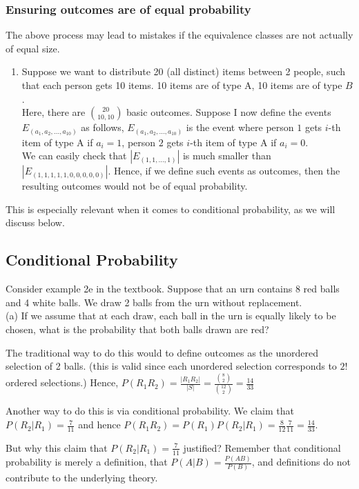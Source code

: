 \documentclass{article}
\begin{document}
\subsubsection{Ensuring outcomes are of equal probability}
The above process may lead to mistakes if the equivalence classes are not actually of equal size.

\begin{enumerate}
	\item Suppose we want to distribute 20 (all distinct) items between 2 people, such that each person gets 10 items. 10 items are of type A, 10 items are of type $B$.\\
	Here, there are $\binom{20}{10,10}$ basic outcomes.
	Suppose I now define the events $E_{(a_1, a_2,...,a_{10})}$ as follows, $E_{(a_1, a_2,...,a_{10})}$ is the event where person $1$ gets $i$-th item of type A if $a_i=1$, person $2$ gets $i$-th item of type A if $a_i=0$. \\
	We can easily check that $|E_{(1, 1,...,1)}|$ is much smaller than $|E_{(1, 1, 1, 1, 1, 0, 0, 0, 0, 0)}|$. Hence, if we define such events as outcomes, then the resulting outcomes would not be of equal probability.
\end{enumerate}


This is especially relevant when it comes to conditional probability, as we will discuss below.



\subsection{Conditional Probability}
Consider example 2e in the textbook.
Suppose that an urn contains 8 red balls and 4 white balls. We draw 2 balls from the urn without replacement. \\
(a) If we assume that at each draw, each ball in the urn is equally likely to be chosen, what is the probability that both balls drawn are red?

The traditional way to do this would to define outcomes as the unordered selection of 2 balls. (this is valid since each unordered selection corresponds to $2!$ ordered selections.) Hence, $P(R_1R_2)=\frac{|R_1R_2|}{|S|}=\frac{\binom{8}{2}}{\binom{12}{2}}=\frac{14}{33}$

Another way to do this is via conditional probability. We claim that $P(R_2|R_1)=\frac{7}{11}$ and hence $P(R_1R_2)=P(R_1)P(R_2|R_1)=\frac{8}{12}\frac{7}{11}=\frac{14}{33}$.

But why this claim that $P(R_2|R_1)=\frac{7}{11}$ justified? Remember that conditional probability is merely a definition, that $P(A|B)=\frac{P(AB)}{P(B)}$, and definitions do not contribute to the underlying theory.
\end{document}
